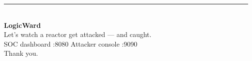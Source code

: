 \documentclass[aspectratio=169,11pt]{beamer}
\newcommand{\code}[1]{{\ttfamily\small #1}}
\begin{document}
{
\begin{frame}[plain]
\vspace{1.4cm}
{\color{accent}\rule{0.4\textwidth}{2.5pt}}\\[10pt]
{\Huge\bfseries\color{white} LogicWard}\\[8pt]
{\large\color{page} Let's watch a reactor get attacked --- and caught.}\\[18pt]
{\color{page}\small SOC dashboard \code{:8080} \quad\textbullet\quad Attacker console \code{:9090}}\\[6pt]
{\color{muted}\footnotesize Thank you.}
\end{frame}
}
\end{document}
